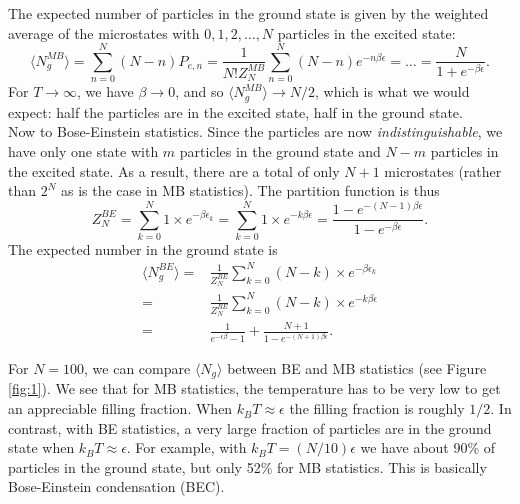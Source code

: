 \documentclass{book}
\theoremstyle{definition}
\newcommand{\f}[2]{\frac{#1}{#2}}
\begin{document}
The expected number of particles in the ground state is given by the weighted average of the microstates with $0, 1,2,\dots,N$ particles in the excited state:
\begin{equation*}
\langle N_g^{MB} \rangle = 
\sum_{n=0}^N (N-n) P_{e,n} = \f{1}{N! Z_N^{MB}} 
\sum_{n=0}^N (N-n)e^{-n\beta \epsilon} = \dots = \f{N}{1+e^{-\beta\epsilon}}.
\end{equation*}
For $T\to \infty$, we have $\beta \to 0$, and so $\langle N_g^{MB} \rangle \to N/2$, which is what we would expect: half the particles are in the excited state, half in the ground state. \\



Now to Bose-Einstein statistics. Since the particles are now \textit{indistinguishable}, we have only one state with $m$ particles in the ground state and $N-m$ particles in the excited state. As a result, there are a total of only $N+1$ microstates (rather than $2^N$ as is the case in MB statistics). The partition function is thus
\begin{equation*}
Z_N^{BE} = \sum^N_{k=0}  1 \times e^{-\beta\epsilon_k} = \sum^N_{k=0}  1 \times e^{-k\beta\epsilon} = \f{1-e^{-(N-1)\beta\epsilon}}{1 - e^{-\beta\epsilon}}.
\end{equation*}
The expected number in the ground state is 
\begin{align*}
\langle N_g^{BE} \rangle =& \f{1}{Z_N^{BE}} \sum^N_{k=0} (N-k)\times e^{-\beta \epsilon_k} \\
=& \f{1}{Z_N^{BE}} \sum^N_{k=0} (N-k)\times e^{-k \beta \epsilon}\\
=& \f{1}{e^{-\epsilon\beta} -1} + \f{N+1}{1-e^{-(N+1)\beta\epsilon}}.
\end{align*}

For $N=100$, we can compare $\langle N_g \rangle$ between BE and MB statistics (see Figure \ref{fig:1}). We see that for MB statistics, the temperature has to be very low to get an appreciable filling fraction. When $k_BT \approx \epsilon$ the filling fraction is roughly $1/2$. In contrast, with BE statistics, a very large fraction of particles are in the ground state when $k_BT \approx \epsilon$. For example, with $k_BT = (N/10)\epsilon$ we have about 90\% of particles in the ground state, but only 52\% for MB statistics. This is basically  Bose-Einstein condensation (BEC).  
\end{document}
